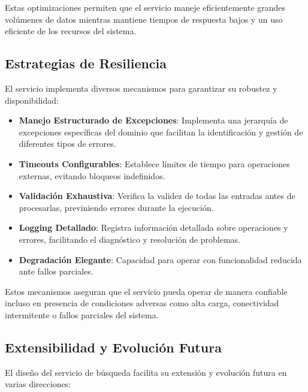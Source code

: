\documentclass[12pt,a4paper]{article}
\begin{document}
Estas optimizaciones permiten que el servicio maneje eficientemente grandes volúmenes de datos mientras mantiene tiempos de respuesta bajos y un uso eficiente de los recursos del sistema.

\subsection{Estrategias de Resiliencia}
\label{subsec:ss-resiliencia}

El servicio implementa diversos mecanismos para garantizar su robustez y disponibilidad:

\begin{itemize}
    \item \textbf{Manejo Estructurado de Excepciones}: Implementa una jerarquía de excepciones específicas del dominio que facilitan la identificación y gestión de diferentes tipos de errores.
    
    \item \textbf{Timeouts Configurables}: Establece límites de tiempo para operaciones externas, evitando bloqueos indefinidos.
    
    \item \textbf{Validación Exhaustiva}: Verifica la validez de todas las entradas antes de procesarlas, previniendo errores durante la ejecución.
    
    \item \textbf{Logging Detallado}: Registra información detallada sobre operaciones y errores, facilitando el diagnóstico y resolución de problemas.
    
    \item \textbf{Degradación Elegante}: Capacidad para operar con funcionalidad reducida ante fallos parciales.
    
\end{itemize}

Estos mecanismos aseguran que el servicio pueda operar de manera confiable incluso en presencia de condiciones adversas como alta carga, conectividad intermitente o fallos parciales del sistema.

\subsection{Extensibilidad y Evolución Futura}
\label{subsec:ss-extension}

El diseño del servicio de búsqueda facilita su extensión y evolución futura en varias direcciones:
\end{document}
